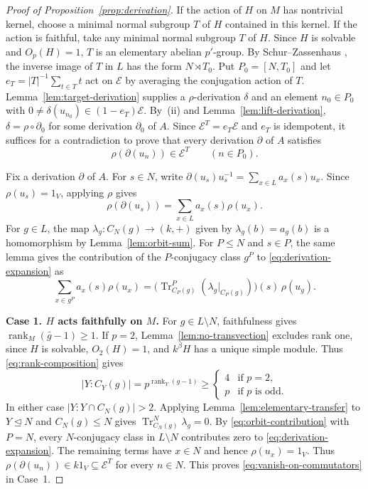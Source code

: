 \documentclass[11pt,a4paper]{article}
\theoremstyle{definition}
\theoremstyle{remark}
\numberwithin{equation}{section}
\DeclareMathOperator{\rank}{rank}
\begin{document}
\begin{proof}[Proof of Proposition~\ref{prop:derivation}]
		If the action of $H$ on $M$ has nontrivial kernel, choose a minimal
		normal subgroup $T$ of $H$ contained in this kernel. If the action is
		faithful, take any minimal normal subgroup $T$ of $H$.
		Since $H$ is solvable and $O_p(H)=1$, $T$ is an elementary abelian
		$p'$-group. By Schur--Zassenhaus \cite[Theorem~3.8]{Isaacs2008}, the inverse
		image of $T$ in $L$ has the form $N\rtimes T_0$. Put $P_0=[N,T_0]$
		and let $e_T=|T|^{-1}\sum_{t\in T}t$ act on $\mathcal E$ by averaging
		the conjugation action of $T$. Lemma~\ref{lem:target-derivation}
		supplies a $\rho$-derivation $\delta$ and an element $n_0\in P_0$ with
		$0\ne\delta(u_{n_0})\in(1-e_T)\mathcal E$. By~(ii) and
		Lemma~\ref{lem:lift-derivation}, $\delta=\rho\circ\partial_0$ for some
		derivation $\partial_0$ of $A$. Since $\mathcal E^T=e_T\mathcal E$ and
		$e_T$ is idempotent, it suffices for a contradiction to prove that every
		derivation $\partial$ of $A$ satisfies
		\begin{equation}\label{eq:vanish-on-commutators}
			\rho(\partial(u_n))\in\mathcal E^T \qquad(n\in P_0).
		\end{equation}
		
		Fix a derivation $\partial$ of $A$. For $s\in N$, write
		$\partial(u_s)u_s^{-1}=\sum_{x\in L}a_x(s)u_x$. Since $\rho(u_s)=1_V$,
		applying $\rho$ gives
		\begin{equation}\label{eq:derivation-expansion}
			\rho(\partial(u_s))=\sum_{x\in L}a_x(s)\rho(u_x).
		\end{equation}
		For $g\in L$, the map $\lambda_g:C_N(g)\to(k,+)$ given by
		$\lambda_g(b)=a_g(b)$ is a homomorphism by Lemma~\ref{lem:orbit-sum}.
		For $P\le N$ and $s\in P$, the same lemma gives the contribution
		of the $P$-conjugacy class $g^P$ to \eqref{eq:derivation-expansion} as
		\begin{equation}\label{eq:orbit-contribution}
			\sum_{x\in g^P}a_x(s)\rho(u_x)
			=\bigl(\operatorname{Tr}_{C_P(g)}^P
			(\lambda_g|_{C_P(g)})\bigr)(s)\,\rho(u_g).
		\end{equation}
		
		\smallskip\noindent\textbf{\boldmath Case 1. $H$ acts faithfully on $M$.}
		For $g\in L\setminus N$, faithfulness gives $\rank_M(\bar g-1)\ge1$.
		If $p=2$, Lemma~\ref{lem:no-transvection} excludes rank one, since
		$H$ is solvable, $O_2(H)=1$, and $k^\beta H$ has a unique simple
		module. Thus \eqref{eq:rank-composition} gives
		\[
		|Y:C_Y(g)|=p^{\rank_Y(g-1)}
		\ge \begin{cases}4 & \text{if }p=2,\\ p & \text{if }p\text{ is odd}.\end{cases}
		\]
		In either case $|Y:Y\cap C_N(g)|>2$. Applying
		Lemma~\ref{lem:elementary-transfer} to $Y\unlhd N$ and $C_N(g)\le N$
		gives $\operatorname{Tr}_{C_N(g)}^N\lambda_g=0$. By
		\eqref{eq:orbit-contribution} with $P=N$, every $N$-conjugacy class
		in $L\setminus N$ contributes zero to \eqref{eq:derivation-expansion}.
		The remaining terms have $x\in N$ and hence $\rho(u_x)=1_V$. Thus
		$\rho(\partial(u_n))\in k1_V\subseteq\mathcal E^T$ for every $n\in N$.
		This proves \eqref{eq:vanish-on-commutators} in Case~1.
		

\end{proof}
\end{document}
